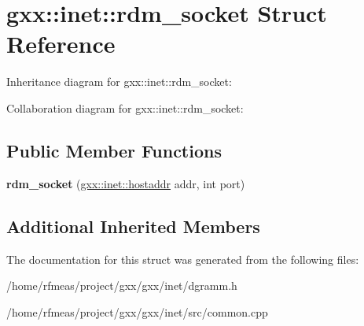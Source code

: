 \hypertarget{structgxx_1_1inet_1_1rdm__socket}{}\section{gxx\+:\+:inet\+:\+:rdm\+\_\+socket Struct Reference}
\label{structgxx_1_1inet_1_1rdm__socket}


Inheritance diagram for gxx\+:\+:inet\+:\+:rdm\+\_\+socket\+:


Collaboration diagram for gxx\+:\+:inet\+:\+:rdm\+\_\+socket\+:
\subsection*{Public Member Functions}
\begin{DoxyCompactItemize}
\item 
{\bfseries rdm\+\_\+socket} (\hyperlink{classgxx_1_1hostaddr}{gxx\+::inet\+::hostaddr} addr, int port)\hypertarget{structgxx_1_1inet_1_1rdm__socket_a98f6c247d8299373d59d55496e1240e5}{}\label{structgxx_1_1inet_1_1rdm__socket_a98f6c247d8299373d59d55496e1240e5}

\end{DoxyCompactItemize}
\subsection*{Additional Inherited Members}


The documentation for this struct was generated from the following files\+:\begin{DoxyCompactItemize}
\item 
/home/rfmeas/project/gxx/gxx/inet/dgramm.\+h\item 
/home/rfmeas/project/gxx/gxx/inet/src/common.\+cpp\end{DoxyCompactItemize}
